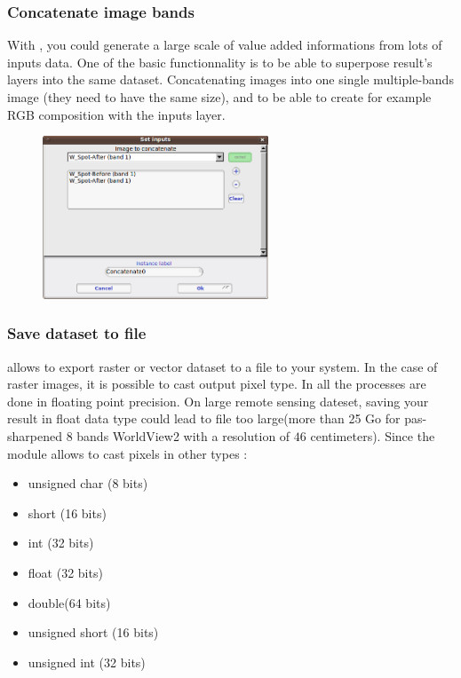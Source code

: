 \subsubsection{Concatenate image bands}
With \mont, you could generate a large scale of value added
informations from lots of inputs data. One of the basic functionnality
is to be able to superpose result's layers into the same dataset.
Concatenating images into one single multiple-bands image (they need
to have the same size), and to be able to create for example RGB
composition with the inputs layer.

\begin{figure}
  \center
  \includegraphics[width=0.6\textwidth]{../Art/MonteverdiImages/monteverdi_concatenate_before_after.png}
  \label{fig:concatenate}
\end{figure}

\subsubsection{Save dataset to file}

\mont allows to export raster or vector dataset to a file to your
system.  In the case of raster images, it is possible to cast output
pixel type. In \mont all the processes are done in floating point
precision.  On large remote sensing dateset, saving your result in
float data type could lead to file too large(more than 25 Go for
pas-sharpened 8 bands WorldView2 with a resolution of $46$
centimeters). Since the module allows to cast pixels in other types :

\begin{itemize}
\item unsigned char (8 bits) 
\item short (16 bits)
\item int (32 bits)
\item float (32 bits)
\item double(64 bits)
\item unsigned short (16 bits)
\item unsigned int (32 bits)
\end{itemize}

